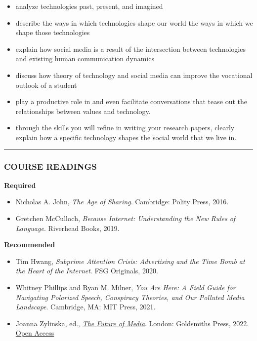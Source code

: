\documentclass[]{tufte-handout}
\providecommand{\tightlist}{%
  \setlength{\itemsep}{0pt}\setlength{\parskip}{0pt}}
\begin{document}
\begin{itemize}
\tightlist
\item
  analyze technologies past, present, and imagined
\item
  describe the ways in which technologies shape our world the ways in
  which we shape those technologies
\item
  explain how social media is a result of the intersection between
  technologies and existing human communication dynamics
\item
  discuss how theory of technology and social media can improve the
  vocational outlook of a student
\item
  play a productive role in and even facilitate conversations that tease
  out the relationships between values and technology.\\
\item
  through the skills you will refine in writing your research papers,
  clearly explain how a specific technology shapes the social world that
  we live in.
\end{itemize}

\begin{center}\rule{0.5\linewidth}{0.5pt}\end{center}

\hypertarget{course-readings}{%
\subsubsection{COURSE READINGS}\label{course-readings}}

\textbf{Required}

\begin{itemize}
\tightlist
\item
  Nicholas A. John, \emph{The Age of Sharing}. Cambridge: Polity Press,
  2016.\\
\item
  Gretchen McCulloch, \emph{Because Internet: Understanding the New
  Rules of Language}. Riverhead Books, 2019.
\end{itemize}

\textbf{Recommended}

\begin{itemize}
\tightlist
\item
  Tim Hwang, \emph{Subprime Attention Crisis: Advertising and the Time
  Bomb at the Heart of the Internet}. FSG Originals, 2020.
\item
  Whitney Phillips and Ryan M. Milner, \emph{You Are Here: A Field Guide
  for Navigating Polarized Speech, Conspiracy Theories, and Our Polluted
  Media Landscape}. Cambridge, MA: MIT Press, 2021.\\
\item
  Joanna Zylinska, ed.,
  \href{https://kclpure.kcl.ac.uk/portal/en/publications/the-future-of-media(ed3f1ada-a46e-4c74-ac5b-9cd59000a732).html}{\emph{The
  Future of Media}}. London: Goldsmiths Press, 2022.
  \href{https://kclpure.kcl.ac.uk/portal/files/171061098/Future_of_Media_Open_Access.pdf}{Open
  Access}
\end{itemize}
\end{document}
